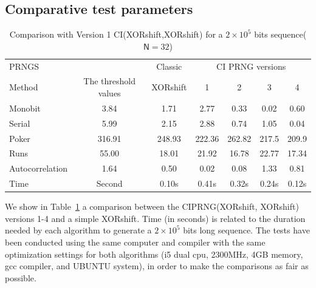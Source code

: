 \subsection{Comparative test parameters}

\begin{table}
\renewcommand{\arraystretch}{1.3}
\caption{Comparison with Version 1 CI(XORshift,XORshift) for a $2 \times 10^5$ bits sequence($\mathsf{N}=32$)}
\label{Comparison22}
\centering
\begin{tabular}{lcccccc}
\toprule
PRNGS & & Classic & \multicolumn{4}{c}{CI PRNG versions}\\
Method & The threshold values& XORshift & 1& 2 &3 & 4 \\ \hline 
 
Monobit			&3.84		&1.71		&2.77		&0.33	&0.02 &0.60 \\ \hline
Serial		&5.99		&2.15		&2.88		&0.74		&1.05 &0.04 \\ \hline
Poker	&316.91	&248.93	&222.36	&262.82		 &217.5 &209.9\\ \hline
Runs 			&55.00	&18.01	&21.92	&16.78	&22.77 &17.34 \\ \hline
Autocorrelation		&1.64		&0.50		&0.02		&0.08 &1.33 &0.81		 \\\hline
Time			&Second		&0.10s		&0.41s	&0.32s & 0.24s &0.12s \\		 
\bottomrule
\end{tabular}
\end{table}



We show in Table~\ref{Comparison22} a comparison between the CIPRNG(XORshift, XORshift) versions 1-4  and a simple XORshift. Time (in seconds) is related to the duration needed by each algorithm to generate a $2 \times 10^5$ bits long sequence. 
The tests have been conducted using the same computer and compiler with the same optimization settings for both algorithms (i5 dual cpu, 2300MHz, 4GB memory, gcc compiler, and UBUNTU system), in order to make the
comparisons as fair as possible. 


